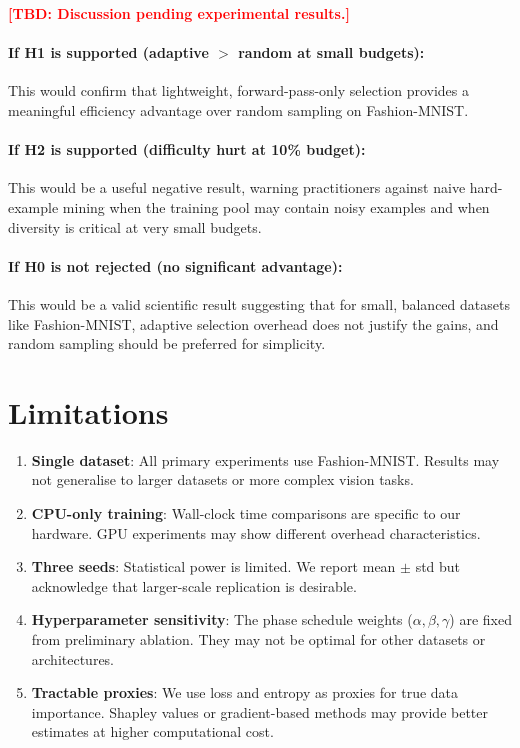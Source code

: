 \documentclass[10pt,twocolumn]{article}
\newcommand{\tbd}[1]{\textcolor{red}{\textbf{[TBD: #1]}}}
\begin{document}
\tbd{Discussion pending experimental results.}

\paragraph{If H1 is supported (adaptive $>$ random at small budgets):}
This would confirm that lightweight, forward-pass-only selection provides
a meaningful efficiency advantage over random sampling on Fashion-MNIST.

\paragraph{If H2 is supported (difficulty hurt at 10\% budget):}
This would be a useful negative result, warning practitioners against
naive hard-example mining when the training pool may contain noisy examples
and when diversity is critical at very small budgets.

\paragraph{If H0 is not rejected (no significant advantage):}
This would be a valid scientific result suggesting that for small, balanced
datasets like Fashion-MNIST, adaptive selection overhead does not justify
the gains, and random sampling should be preferred for simplicity.

\section{Limitations}
\label{sec:limitations}

\begin{enumerate}
  \item \textbf{Single dataset}: All primary experiments use Fashion-MNIST.
    Results may not generalise to larger datasets or more complex vision tasks.
  \item \textbf{CPU-only training}: Wall-clock time comparisons are specific
    to our hardware. GPU experiments may show different overhead characteristics.
  \item \textbf{Three seeds}: Statistical power is limited. We report
    mean $\pm$ std but acknowledge that larger-scale replication is desirable.
  \item \textbf{Hyperparameter sensitivity}: The phase schedule weights
    ($\alpha, \beta, \gamma$) are fixed from preliminary ablation. They may
    not be optimal for other datasets or architectures.
  \item \textbf{Tractable proxies}: We use loss and entropy as proxies for
    true data importance. Shapley values or gradient-based methods may provide
    better estimates at higher computational cost.
\end{enumerate}
\end{document}

